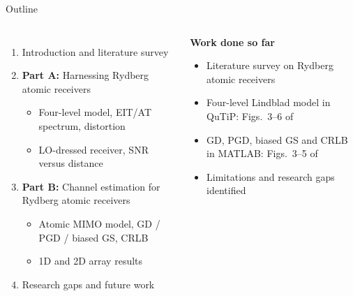 \documentclass[10pt,xcolor=x11names,compress,aspectratio=169]{beamer}
\begin{document}
\begin{frame}{Outline}
\begin{columns}[T]
\begin{enumerate}\setlength\itemsep{6pt}
  \item Introduction and literature survey
  \item \textbf{Part A:} Harnessing Rydberg atomic receivers~\cite{chen2025harnessing}
  \begin{itemize}\small
    \item Four-level model, EIT/AT spectrum, distortion
    \item LO-dressed receiver, SNR versus distance
  \end{itemize}
  \item \textbf{Part B:} Channel estimation for Rydberg atomic receivers~\cite{xu2025channel}
  \begin{itemize}\small
    \item Atomic MIMO model, GD / PGD / biased GS, CRLB
    \item 1D and 2D array results
  \end{itemize}
  \item Research gaps and future work
\end{enumerate}
\begin{tcolorbox}[mybox]
  \small\textbf{Work done so far}
  \begin{itemize}\footnotesize\setlength\itemsep{2pt}
    \item Literature survey on Rydberg atomic receivers
    \item Four-level Lindblad model in QuTiP: Figs.~3--6 of~\cite{chen2025harnessing}
    \item GD, PGD, biased GS and CRLB in MATLAB: Figs.~3--5 of~\cite{xu2025channel}
    \item Limitations and research gaps identified
  \end{itemize}
\end{tcolorbox}
\end{columns}
\end{frame}
\end{document}
